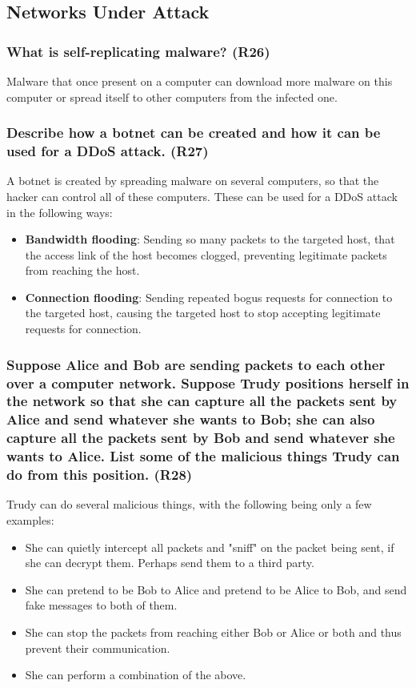 \subsection{Networks Under Attack}

\subsubsection{What is self-replicating malware? (R26)}
Malware that once present on a computer can download more malware on this computer or spread itself to other computers from the infected one.


\subsubsection{Describe how a botnet can be created and how it can be used for a DDoS attack. (R27)}
A botnet is created by spreading malware on several computers, so that the hacker can control all of these computers. These can be used for a DDoS attack in the following ways:
\begin{itemize}
    \item \textbf{Bandwidth flooding}: Sending so many packets to the targeted host, that the access link of the host becomes clogged, preventing legitimate packets from reaching the host.
    \item \textbf{Connection flooding}: Sending repeated bogus requests for connection to the targeted host, causing the targeted host to stop accepting legitimate requests for connection.
\end{itemize}



\subsubsection{Suppose Alice and Bob are sending packets to each other over a computer network. Suppose Trudy positions herself in the network so that she can capture all the packets sent by Alice and send whatever she wants to Bob; she can also capture all the packets sent by Bob and send whatever she wants to Alice. List some of the malicious things Trudy can do from this position. (R28)}
Trudy can do several malicious things, with the following being only a few examples:
\begin{itemize}
    \item She can quietly intercept all packets and "sniff" on the packet being sent, if she can decrypt them. Perhaps send them to a third party.
    \item She can pretend to be Bob to Alice and pretend to be Alice to Bob, and send fake messages to both of them.
    \item She can stop the packets from reaching either Bob or Alice or both and thus prevent their communication.
    \item She can perform a combination of the above.
\end{itemize}